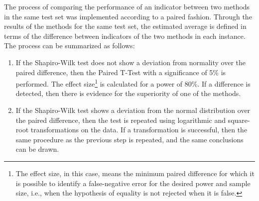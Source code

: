 				The process of comparing the performance of an indicator between two methods in the same test set was implemented according to a paired fashion. Through the results of the methods for the same test set, the estimated average is defined in terms of the difference between indicators of the two methods in each instance.  The process can be summarized as follows:
				\begin{enumerate}
					\item If the Shapiro-Wilk test does not show a deviation from normality over the paired difference, then the Paired T-Test with a significance of 5\% is performed. The effect size\footnote{The effect size, in this case, means the minimum paired difference for which it is possible to identify a false-negative error for the desired power and sample size, i.e., when the hypothesis of equality is not rejected when it is false.} is calculated for a power of 80\%. If a difference is detected, then there is evidence for the superiority of one of the methods.
					\item If the Shapiro-Wilk test shows a deviation from the normal distribution over the paired difference, then the test is repeated using logarithmic and square-root transformations on the data. If a transformation is successful, then the same procedure as the previous step is repeated, and the same conclusions can be drawn.

\end{enumerate}
